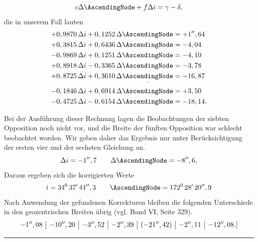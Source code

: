 \begin{landscape}
\[c\Delta\AscendingNode+f\Delta i=\gamma-\delta,\]
die in unserem Fall lauten
\[\begin{aligned}
+0,9870\,\Delta i+0,1252\,\Delta\AscendingNode&=+1'',64\\
+0,3815\,\Delta i+0,6436\,\Delta\AscendingNode&=-4,04\\
-0,9869\,\Delta i+0,1251\,\Delta\AscendingNode&=-4,10\\
+0,8918\,\Delta i-0,3365\,\Delta\AscendingNode&=-3,78\\
+0,8725\,\Delta i+0,3610\,\Delta\IVtwoLowNode&=-16,87\\
-0,1846\,\Delta i+0,6914\,\Delta\AscendingNode&=+3,50\\
-0,4725\,\Delta i-0,6154\,\Delta\AscendingNode&=-18,14.
\end{aligned}\]
\par
Bei der Ausführung dieser Rechnung lagen die Beobachtungen der siebten Opposition noch nicht vor, und die Breite der fünften Opposition war schlecht beobachtet worden. Wir geben daher das Ergebnis nur unter Berücksichtigung der ersten vier und der sechsten Gleichung an.
\[\Delta i=-1'',7\qquad\Delta\AscendingNode=-8'',6,\]
Daraus ergeben sich die korrigierten Werte
\[i=34^0\,37'\,44'',3\qquad\AscendingNode=172^0\,28'\,20'',9\]
Nach Anwendung der gefundenen Korrekturen bleiben die folgenden Unterschiede in den geozentrischen Breiten übrig (vgl. Band VI, Seite 329).
\[\begin{array}{@{}r|r|r|r|r|r|r@{}}
-1'',08&-10'',20&-3'',52&-2'',39&(-21'',42)&-2'',11&-12'',08.]
\end{array}\]
\begin{center}\rule{.22\linewidth}{.3pt}\end{center}
\endgroup
\end{landscape}
